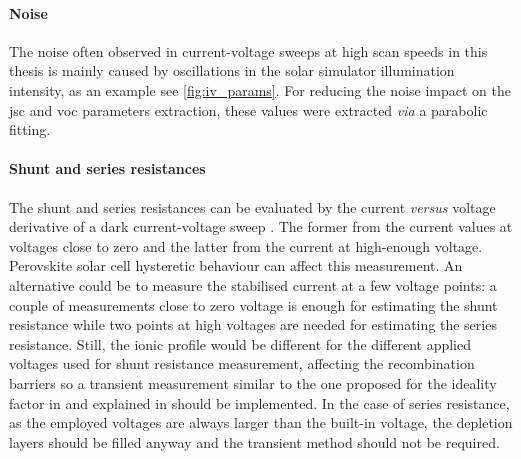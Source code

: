 	\paragraph{Noise}
	The noise often observed in current-voltage sweeps at high scan speeds in this thesis is mainly caused by oscillations in the solar simulator illumination intensity, as an example see \cref{fig:iv_params}.
	For reducing the noise impact on the \gls{jsc} and \gls{voc} parameters extraction, these values were extracted \textsl{via} a parabolic fitting.

	\paragraph{Shunt and series resistances} \label{resistances}
	The shunt and series resistances can be evaluated by the current \textsl{versus} voltage derivative of a dark current-voltage sweep \cite{Pysch2007}.
	The former from the current values at voltages close to zero and the latter from the current at high-enough voltage.
	Perovskite solar cell hysteretic behaviour can affect this measurement.
	An alternative could be to measure the stabilised current at a few voltage points: a couple of measurements close to zero voltage is enough for estimating the shunt resistance while two points at high voltages are needed for estimating the series resistance.
	Still, the ionic profile would be different for the different applied voltages used for shunt resistance measurement, affecting the recombination barriers \cite{Moia2019,Pockett2017} so a transient measurement similar to the one proposed for the ideality factor in \cite{Calado2019} and explained in  should be implemented.
	In the case of series resistance, as the employed voltages are always larger than the built-in voltage, the depletion layers should be filled anyway and the transient method should not be required.

